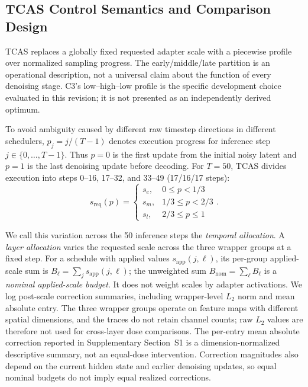\documentclass[times,twocolumn,final]{elsarticle}
\begin{document}
\subsection{TCAS Control Semantics and Comparison Design}
\label{subsec:tcas}

TCAS replaces a globally fixed requested adapter scale with a piecewise profile over normalized sampling progress. The early/middle/late partition is an operational description, not a universal claim about the function of every denoising stage. C3's low--high--low profile is the specific development choice evaluated in this revision; it is not presented as an independently derived optimum.

To avoid ambiguity caused by different raw timestep directions in different schedulers, $p_j=j/(T-1)$ denotes execution progress for inference step $j\in\{0,\ldots,T-1\}$. Thus $p=0$ is the first update from the initial noisy latent and $p=1$ is the last denoising update before decoding. For $T=50$, TCAS divides execution into steps 0--16, 17--32, and 33--49 (17/16/17 steps):
\begin{equation}
s_{\mathrm{req}}(p) = \begin{cases} s_e, & 0 \leq p < 1/3 \\ s_m, & 1/3 \leq p < 2/3 \\ s_l, & 2/3 \leq p \leq 1 \end{cases}.
\label{eq:tcas}
\end{equation}

We call this variation across the 50 inference steps the \emph{temporal allocation}. A \emph{layer allocation} varies the requested scale across the three wrapper groups at a fixed step. For a schedule with applied values $s_{\mathrm{app}}(j,\ell)$, its per-group applied-scale sum is $B_\ell=\sum_j s_{\mathrm{app}}(j,\ell)$; the unweighted sum $B_{\mathrm{nom}}=\sum_\ell B_\ell$ is a \emph{nominal applied-scale budget}. It does not weight scales by adapter activations. We log post-scale correction summaries, including wrapper-level $L_2$ norm and mean absolute entry. The three wrapper groups operate on feature maps with different spatial dimensions, and the traces do not retain channel counts; raw $L_2$ values are therefore not used for cross-layer dose comparisons. The per-entry mean absolute correction reported in Supplementary Section~S1 is a dimension-normalized descriptive summary, not an equal-dose intervention. Correction magnitudes also depend on the current hidden state and earlier denoising updates, so equal nominal budgets do not imply equal realized corrections.
\end{document}
